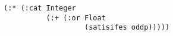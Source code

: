 \begin{lstlisting}[style=reclojureClojure]
(:* (:cat Integer 
          (:+ (:or Float
                   (satisifes oddp)))))
\end{lstlisting}
